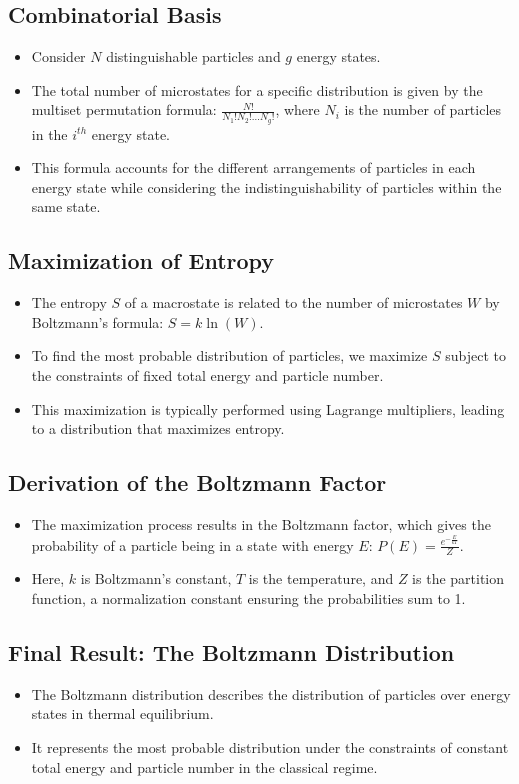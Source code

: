 \documentclass[12pt]{article}
\begin{document}
\subsection{Combinatorial Basis}
\begin{itemize}
    \item Consider $N$ distinguishable particles and $g$ energy states.
    \item The total number of microstates for a specific distribution is given by the multiset permutation formula: $\frac{N!}{N_1!N_2!\ldots N_g!}$, where $N_i$ is the number of particles in the $i^{th}$ energy state.
    \item This formula accounts for the different arrangements of particles in each energy state while considering the indistinguishability of particles within the same state.
\end{itemize}

\subsection{Maximization of Entropy}
\begin{itemize}
    \item The entropy $S$ of a macrostate is related to the number of microstates $W$ by Boltzmann's formula: $S = k \ln(W)$.
    \item To find the most probable distribution of particles, we maximize $S$ subject to the constraints of fixed total energy and particle number.
    \item This maximization is typically performed using Lagrange multipliers, leading to a distribution that maximizes entropy.
\end{itemize}

\subsection{Derivation of the Boltzmann Factor}
\begin{itemize}
    \item The maximization process results in the Boltzmann factor, which gives the probability of a particle being in a state with energy $E$: $P(E) = \frac{e^{-\frac{E}{kT}}}{Z}$.
    \item Here, $k$ is Boltzmann's constant, $T$ is the temperature, and $Z$ is the partition function, a normalization constant ensuring the probabilities sum to 1.
\end{itemize}

\subsection{Final Result: The Boltzmann Distribution}
\begin{itemize}
    \item The Boltzmann distribution describes the distribution of particles over energy states in thermal equilibrium.
    \item It represents the most probable distribution under the constraints of constant total energy and particle number in the classical regime.
\end{itemize}
\end{document}
